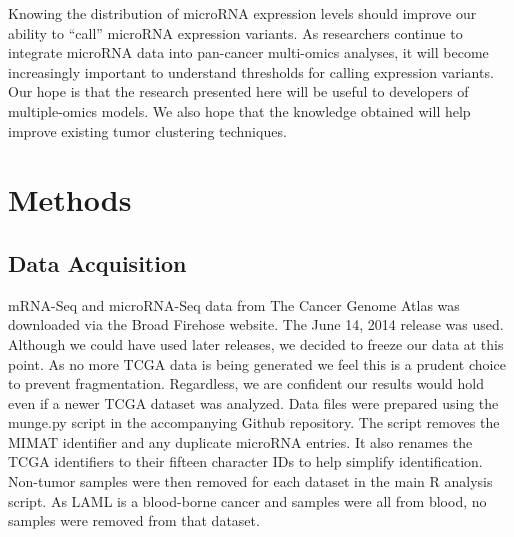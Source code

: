 \documentclass[12pt]{report}
\begin{document}
Knowing the distribution of microRNA expression levels should improve our ability to ``call''
microRNA expression variants. As researchers continue to integrate microRNA data into pan-cancer multi-omics analyses, it will become increasingly important to understand
thresholds for calling expression variants. Our hope is that the research presented here will be useful to developers of multiple-omics models. We also hope that the knowledge
obtained will help improve existing tumor clustering techniques.

\section*{Methods}
\subsection*{Data Acquisition}
mRNA-Seq and microRNA-Seq data from The Cancer Genome Atlas was downloaded via the Broad Firehose website.
The June 14, 2014 release was used. Although we could have used later releases, we decided to freeze our data at this point. As no more
TCGA data is being generated we feel this is a prudent choice to prevent fragmentation. Regardless, we are confident our results would hold
even if a newer TCGA dataset was analyzed. Data files were prepared using the munge.py script in the accompanying Github repository. The script
removes the MIMAT identifier and any duplicate microRNA entries. It also renames the TCGA identifiers to their fifteen character IDs to help
simplify identification. Non-tumor samples were then removed for each dataset in the main R analysis script. As LAML is a blood-borne cancer and samples were all from blood,
no samples were removed from that dataset.





\end{document}
